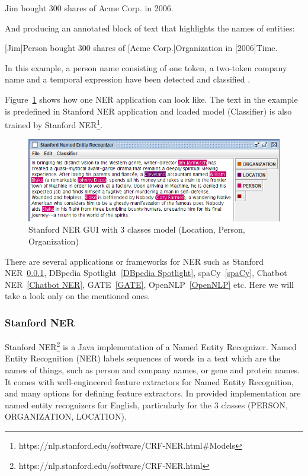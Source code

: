 \documentclass[thesis=M,english]{FITthesis}[2018/05/30]
\begin{document}
Jim bought 300 shares of Acme Corp. in 2006.

And producing an annotated block of text that highlights the names of entities:

[Jim]Person bought 300 shares of [Acme Corp.]Organization in [2006]Time.

In this example, a person name consisting of one token, a two-token company name and a temporal expression have been detected and classified \cite{wiki:NER}.

	Figure~\ref{fig:StanfordNER} shows how one NER application can look like. The text in the example is predefined in Stanford NER application and loaded model (Classifier) is also trained by Stanford NER\footnote{https://nlp.stanford.edu/software/CRF-NER.html\#Models}.

	\begin{figure}[H]\centering
		\includegraphics[width=\textwidth]{NER-Stanford}
		\caption{Stanford NER GUI with 3 classes model (Location, Person, Organization)}\label{fig:StanfordNER}
	\end{figure}

	There are several applications or frameworks for NER such as Stanford NER~\ref{Stanford NER}, DBpedia Spotlight~\ref{DBpedia Spotlight}, spaCy~\ref{spaCy}, Chatbot NER~\ref{Chatbot NER}, GATE~\ref{GATE}, OpenNLP~\ref{OpenNLP} etc. Here we will take a look only on the mentioned ones.

\subsubsection{Stanford NER}\label{Stanford NER}
Stanford NER\footnote{https://nlp.stanford.edu/software/CRF-NER.html} is a Java implementation of a Named Entity Recognizer. Named Entity Recognition (NER) labels sequences of words in a text which are the names of things, such as person and company names, or gene and protein names. It comes with well-engineered feature extractors for Named Entity Recognition, and many options for defining feature extractors. In provided implementation are named entity recognizers for English, particularly for the 3 classes (PERSON, ORGANIZATION, LOCATION).
\end{document}

